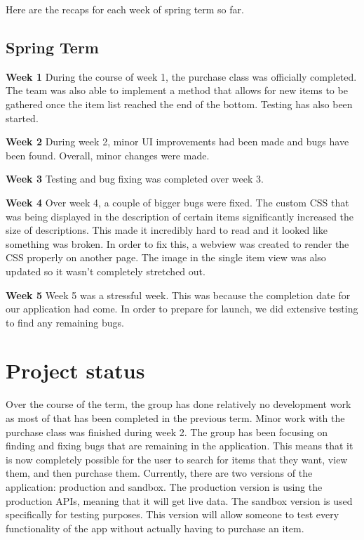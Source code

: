 \documentclass[journal,compsoc, 10pt, draftclsnofoot, onecolumn]{IEEEtran}
\begin{document}
Here are the recaps for each week of spring term so far.

\subsection{Spring Term}
\textbf{Week 1}\newline
During the course of week 1, the purchase class was officially completed. The team 
was also able to implement a method that allows for new items to be gathered once 
the item list reached the end of the bottom. Testing has also been started.

\textbf{Week 2}\newline
During week 2, minor UI improvements had been made and bugs have been found. 
Overall, minor changes were made.

\textbf{Week 3}\newline
Testing and bug fixing was completed over week 3.

\textbf{Week 4}\newline
Over week 4, a couple of bigger bugs were fixed. The custom CSS that was being 
displayed in the description of certain items significantly increased the size of descriptions. 
This made it incredibly hard to read and it looked like something was broken. In order to 
fix this, a webview was created to render the CSS properly on another page. The 
image in the single item view was also updated so it wasn't completely stretched out.

\textbf{Week 5}\newline
Week 5 was a stressful week. This was because the completion date for our 
application had come. In order to prepare for launch, we did extensive testing to 
find any remaining bugs. 

\section{Project status}
Over the course of the term, the group has done relatively no development work as 
most of that has been completed in the previous term. Minor work with the purchase 
class was finished during week 2. The group has been focusing on finding and fixing 
bugs that are remaining in the application. This means that it is now completely 
possible for the user to search for items that they want, view them, and then 
purchase them. Currently, there are two versions of the application: production 
and sandbox. The production version is using the production APIs, meaning that 
it will get live data. The sandbox version is used specifically for testing purposes. 
This version will allow someone to test every functionality of the app without 
actually having to purchase an item. 
\end{document}
